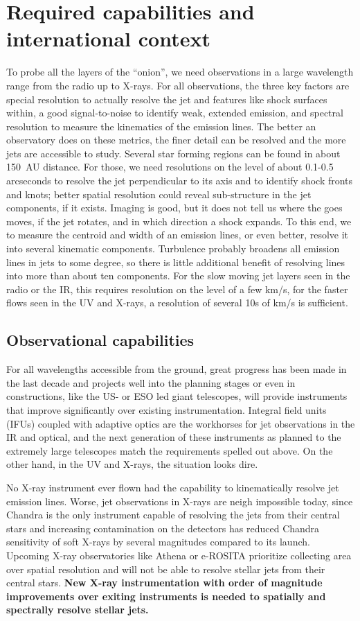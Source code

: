 \documentclass[12pt]{article}
\begin{document}
\section{Required capabilities and international context}
To probe all the layers of the ``onion'', we need observations in a large wavelength range from the radio up to X-rays. For all observations, the three key factors are special resolution to actually resolve the jet and features like shock surfaces within, a good signal-to-noise to identify weak, extended emission, and spectral resolution to measure the kinematics of the emission lines. The better an observatory does on these metrics, the finer detail can be resolved and the more jets are accessible to study. Several star forming regions can be found in about 150~AU distance. For those, we need resolutions on the level of about 0.1-0.5 arcseconds to resolve the jet perpendicular to its axis and to identify shock fronts and knots; better spatial resolution could reveal sub-structure in the jet components, if it exists. Imaging is good, but it does not tell us where the goes moves, if the jet rotates, and in which direction a shock expands. To this end, we to measure the centroid and width of an emission lines, or even better, resolve it into several kinematic components. Turbulence probably broadens all emission lines in jets to some degree, so there is little additional benefit of resolving lines into more than about ten components. For the slow moving jet layers seen in the radio or the IR, this requires resolution on the level of a few km/s, for the faster flows seen in the UV and X-rays, a resolution of several 10s of km/s is sufficient.

\subsection{Observational capabilities}
For all wavelengths accessible from the ground, great progress has been made in the last decade and projects well into the planning stages or even in constructions, like the US- or ESO led giant telescopes, will provide instruments that improve significantly over existing instrumentation. Integral field units (IFUs) coupled with adaptive optics are the workhorses for jet observations in the IR and optical, and the next generation of these instruments as planned to the extremely large telescopes match the requirements spelled out above. On the other hand, in the UV and X-rays, the situation looks dire. 

No X-ray instrument ever flown had the capability to kinematically resolve jet emission lines. Worse, jet observations in X-rays are neigh impossible today, since Chandra is the only instrument capable of resolving the jets from their central stars and increasing contamination on the detectors has reduced Chandra sensitivity of soft X-rays by several magnitudes compared to its launch. Upcoming X-ray observatories like Athena or e-ROSITA prioritize collecting area over spatial resolution and will not be able to resolve stellar jets from their central stars. \textbf{New X-ray instrumentation with order of magnitude improvements over exiting instruments is needed to spatially and spectrally resolve stellar jets.}
\end{document}
